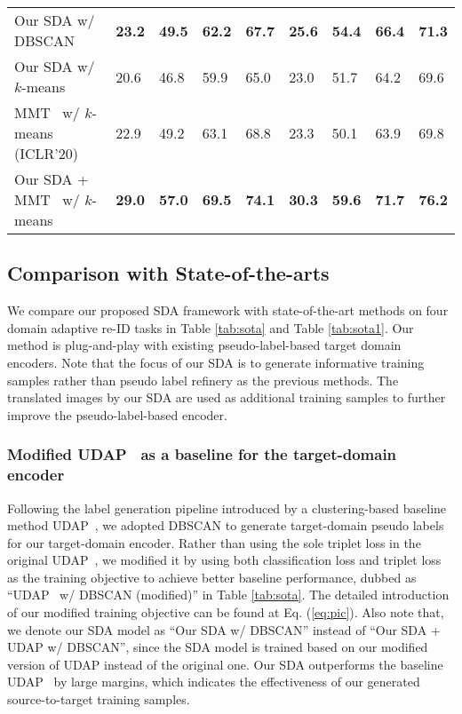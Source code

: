 \documentclass[journal]{IEEEtran}
\begin{document}
\begin{table*}[t]
\begin{center}
\begin{tabular}{P{5cm}|C{1cm}C{1cm}C{1cm}C{1cm}|C{1cm}C{1cm}C{1cm}C{1cm}}
	Our SDA w/ {DBSCAN} & \textbf{23.2} & \textbf{49.5} & \textbf{62.2} & \textbf{67.7} & \textbf{25.6} & \textbf{54.4} & \textbf{66.4} & \textbf{71.3} \\
    Our SDA w/ {$k$-means}  &  {20.6} & {46.8} & {59.9} & {65.0} & {23.0} & {51.7} & {64.2} & {69.6} \\
	\hline
	MMT~\cite{ge2020mutual} w/ {$k$-means} (ICLR'20) & {22.9} & {49.2} & {63.1} & {68.8} & {23.3} & {50.1} & {63.9} & {69.8} \\
	Our SDA + MMT~\cite{ge2020mutual} w/ {$k$-means} & \textbf{29.0} & \textbf{57.0} & \textbf{69.5} & \textbf{74.1 } & \textbf{30.3} & \textbf{59.6} & \textbf{71.7} & \textbf{76.2} \\
	\hline
	\end{tabular}
	\end{center}
\end{table*}



\subsection{Comparison with State-of-the-arts}
\label{sec:sota}

We compare our proposed SDA framework with state-of-the-art methods on four domain adaptive re-ID tasks in Table \ref{tab:sota} and Table \ref{tab:sota1}.
Our method is plug-and-play with existing pseudo-label-based target domain encoders.
Note that the focus of our SDA is to generate informative training samples rather than pseudo label refinery as the previous methods. The translated images by our SDA are used as additional training samples to further improve the pseudo-label-based encoder.

\subsubsection{\textbf{ {Modified} UDAP~\cite{song2018unsupervised} as a baseline for the target-domain encoder}}
Following the label generation pipeline introduced by a clustering-based baseline method UDAP~\cite{song2018unsupervised},
we adopted DBSCAN \cite{ester1996density} to generate target-domain pseudo labels for our target-domain encoder.
{Rather than using the sole triplet loss in the original UDAP~\cite{song2018unsupervised}, we modified it by using both classification loss and triplet loss as the training objective to achieve better baseline performance, dubbed as ``UDAP~\cite{song2018unsupervised} w/ DBSCAN (modified)'' in Table \ref{tab:sota}.  The detailed introduction of our modified training objective can be found at Eq. (\ref{eq:pic}).  Also note that, we denote our SDA model as ``Our SDA w/ {DBSCAN}'' instead of ``Our SDA + UDAP w/ {DBSCAN}'', since the SDA model is trained based on our modified version of UDAP instead of the original one.}
Our SDA outperforms the baseline UDAP~\cite{song2018unsupervised} by large margins, which indicates the effectiveness of our generated source-to-target training samples.
\end{document}
